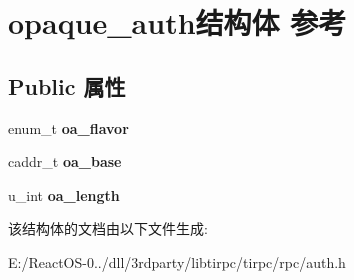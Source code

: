 \hypertarget{structopaque__auth}{}\section{opaque\+\_\+auth结构体 参考}
\label{structopaque__auth}
\subsection*{Public 属性}
\begin{DoxyCompactItemize}
\item 
\mbox{\label{structopaque__auth_ad9a34ddcf0baf7a2d790b1b53a93133f}} 
enum\+\_\+t {\bfseries oa\+\_\+flavor}
\item 
\mbox{\label{structopaque__auth_a492aad2acbeed7f7b07d14f4e682b7ff}} 
caddr\+\_\+t {\bfseries oa\+\_\+base}
\item 
\mbox{\label{structopaque__auth_a2268d1f98a85fdf7946adf6ea2bcd530}} 
u\+\_\+int {\bfseries oa\+\_\+length}
\end{DoxyCompactItemize}


该结构体的文档由以下文件生成\+:\begin{DoxyCompactItemize}
\item 
E\+:/\+React\+O\+S-\/0../dll/3rdparty/libtirpc/tirpc/rpc/auth.\+h\end{DoxyCompactItemize}
